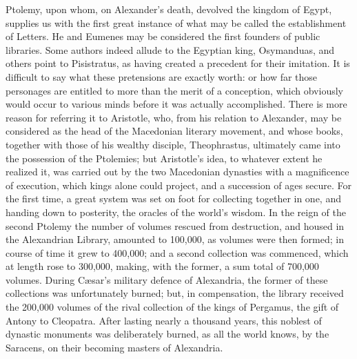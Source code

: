 Ptolemy, upon whom, on Alexander's death, devolved the kingdom of
Egypt, supplies us with the first great instance of what may be called
the establishment of Letters. He and Eumenes may be considered the
first founders of public libraries. Some authors indeed allude to the
Egyptian king, Osymanduas, and others point to Pisistratus, as having
created a precedent for their imitation. It is difficult to say what
these pretensions are exactly worth: or how far those personages are
entitled to more than the merit of a conception, which obviously would
occur to various minds before it was actually accomplished. There is
more reason for referring it to Aristotle, who, from his relation to
Alexander, may be considered as the head of the Macedonian literary
movement, and whose books, together with those of his wealthy
disciple, Theophrastus, ultimately came into the possession of the
Ptolemies; but Aristotle's idea, to whatever extent he realized it,
was carried out by the two Macedonian dynasties with a
magnificence of execution, which kings alone could project, and a
succession of ages secure. For the first time, a great system was set
on foot for collecting together in one, and handing down to posterity,
the oracles of the world's wisdom. In the reign of the second Ptolemy
the number of volumes rescued from destruction, and housed in the
Alexandrian Library, amounted to 100,000, as volumes were then formed;
in course of time it grew to 400,000; and a second collection was
commenced, which at length rose to 300,000, making, with the former, a
sum total of 700,000 volumes. During Cæsar's military defence of
Alexandria, the former of these collections was unfortunately burned;
but, in compensation, the library received the 200,000 volumes of the
rival collection of the kings of Pergamus, the gift of Antony to
Cleopatra. After lasting nearly a thousand years, this noblest of
dynastic monuments was deliberately burned, as all the world knows, by
the Saracens, on their becoming masters of Alexandria.

